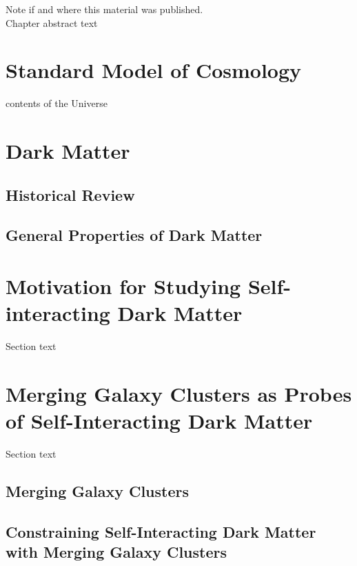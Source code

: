 \label{chapter:1}

\noindent Note if and where this material was published. \\

Chapter abstract text

\section{Standard Model of Cosmology}

contents of the Universe


\section{Dark Matter}

\subsection{Historical Review}

\subsection{General Properties of Dark Matter}

\section{Motivation for Studying Self-interacting Dark Matter}

Section text \citet{Bradac:2008gw}

\section{Merging Galaxy Clusters as Probes of Self-Interacting Dark Matter}

Section text

\subsection{Merging Galaxy Clusters}

\subsection{Constraining Self-Interacting Dark Matter with Merging Galaxy Clusters}